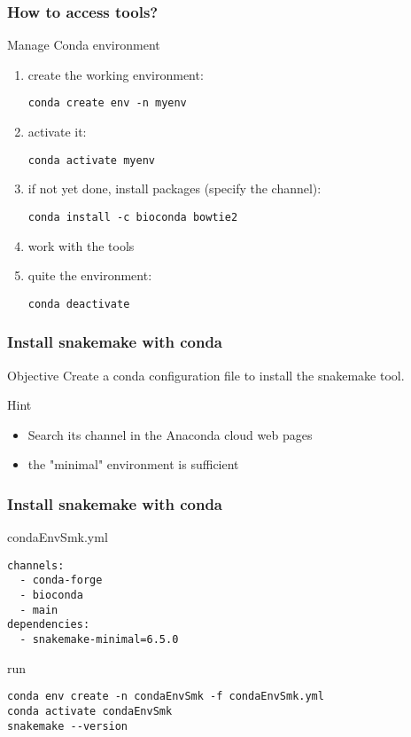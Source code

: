 \begin{frame}[containsverbatim]
\frametitle{How to access tools?}
\begin{exampleblock}{Manage Conda environment}
\begin{enumerate}
    \item create the working environment:
\begin{lstlisting}
conda create env -n myenv
\end{lstlisting}
    \item activate it: 
\begin{lstlisting}
conda activate myenv
\end{lstlisting}
    \item if not yet done, install packages (specify the channel): 
\begin{lstlisting}
conda install -c bioconda bowtie2
\end{lstlisting}
    \item work with the tools
    \item quite the environment: 
\begin{lstlisting}
conda deactivate
\end{lstlisting}
\end{enumerate}
\end{exampleblock}
\end{frame}
\begin{frame}[containsverbatim]
\frametitle{Install snakemake with conda}
\begin{exampleblock}{Objective}
Create a conda configuration file to install the snakemake tool.
\end{exampleblock}
\begin{exampleblock}{Hint}
\begin{itemize}
    \item Search its channel in the Anaconda cloud web pages
    \item the "minimal" environment is sufficient
\end{itemize}
\end{exampleblock}
\end{frame}
\begin{frame}[containsverbatim]
\frametitle{Install snakemake with conda}
\begin{exampleblock}{condaEnvSmk.yml}
\begin{lstlisting}
channels:
  - conda-forge
  - bioconda
  - main
dependencies:
  - snakemake-minimal=6.5.0
\end{lstlisting}
\end{exampleblock}
\begin{exampleblock}{run}
\begin{lstlisting}
conda env create -n condaEnvSmk -f condaEnvSmk.yml
conda activate condaEnvSmk
snakemake --version
\end{lstlisting}
\end{exampleblock}
\end{frame}
